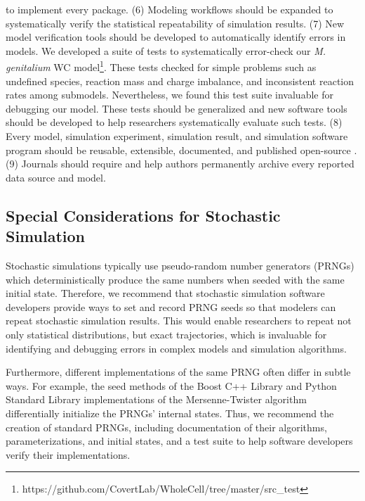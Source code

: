 \documentclass[journal,transmag,twoside]{IEEEtran}
\begin{document}
to implement every package. (6) Modeling workflows should be expanded to systematically verify the statistical repeatability of simulation results. (7) New model verification tools should be developed to automatically identify errors in models. We developed a suite of tests to systematically error-check our \textit{M. genitalium} WC model\footnote{https://github.com/CovertLab/WholeCell/tree/master/src\_test}. These tests checked for simple problems such as undefined species, reaction mass and charge imbalance, and inconsistent reaction rates among submodels. Nevertheless, we found this test suite invaluable for debugging our model. These tests should be generalized and new software tools should be developed to help researchers systematically evaluate such tests. (8) Every model, simulation experiment, simulation result, and simulation software program should be reusable, extensible, documented, and published open-source \cite{easterbrook2014open}. (9) Journals should require and help authors permanently archive every reported data source and model.

\subsection{Special Considerations for Stochastic Simulation}
Stochastic simulations typically use pseudo-random number generators (PRNGs) which deterministically produce the same numbers when seeded with the same initial state. Therefore, we recommend that stochastic simulation software developers provide ways to set and record PRNG seeds so that modelers can repeat stochastic simulation results. This would enable researchers to repeat not only statistical distributions, but exact trajectories, which is invaluable for identifying and debugging errors in complex models and simulation algorithms.

Furthermore, different implementations of the same PRNG often differ in subtle ways. For example, the seed methods of the Boost C++ Library \cite{schaling2011boost} and Python Standard Library implementations of the Mersenne-Twister algorithm differentially initialize the PRNGs' internal states. Thus, we recommend the creation of standard PRNGs, including documentation of their algorithms, parameterizations, and initial states, and a test suite to help software developers verify their implementations.
 
\end{document}
